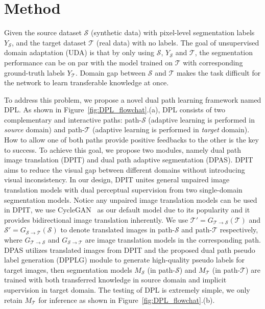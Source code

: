 \documentclass[10pt,twocolumn,letterpaper]{article}
\begin{document}
\section{Method}
Given the source dataset $\mathcal{S}$ (synthetic data) with pixel-level segmentation labels $Y_\mathcal{S}$, and the target dataset $\mathcal{T}$ (real data) with no labels. The goal of unsupervised domain adaptation (UDA) is that by only using $\mathcal{S}$, $Y_\mathcal{S}$ and $\mathcal{T}$, the segmentation performance can be on par with the model trained on $\mathcal{T}$ with corresponding ground-truth labels $Y_\mathcal{T}$. Domain gap between $\mathcal{S}$ and $\mathcal{T}$ makes the task difficult for the network to learn transferable knowledge at once.

To address this problem, we propose a novel dual path learning framework named DPL. As shown in Figure~\ref{fig:DPL_flowchat}.(a), DPL consists of two complementary and interactive paths: path-$\mathcal{S}$ (adaptive learning is performed in \emph{source} domain) and path-$\mathcal{T}$ (adaptive learning is performed in \emph{target} domain). How to allow one of both paths provide positive feedbacks to the other is the key to success. To achieve this goal, we propose two modules, namely dual path image translation (DPIT) and dual path adaptive segmentation (DPAS). DPIT aims to reduce the visual gap between different domains without introducing visual inconsistency. In our design, DPIT unites general unpaired image translation models with dual perceptual supervision from two single-domain segmentation models. Notice any unpaired image translation models can be used in DPIT, we use CycleGAN~\cite{CycleGAN2017} as our default model due to its popularity and it provides bidirectional image translation inherently. We use
$\mathcal{T}'=G_{\mathcal{T}\rightarrow\mathcal{S}}(\mathcal{T})$ and $\mathcal{S}'=G_{\mathcal{S}\rightarrow\mathcal{T}}(\mathcal{S})$ to denote translated images in path-$\mathcal{S}$ and path-$\mathcal{T}$ respectively, where $G_{\mathcal{T}\rightarrow\mathcal{S}}$ and $G_{\mathcal{S}\rightarrow\mathcal{T}}$ are image translation models in the corresponding path. DPAS utilizes translated images from DPIT and the proposed dual path pseudo label generation (DPPLG) module to generate high-quality pseudo labels for target images, then segmentation models $M_{\mathcal{S}}$ (in path-$\mathcal{S}$) and $M_{\mathcal{T}}$ (in path-$\mathcal{T}$) are trained with both transferred knowledge in source domain and implicit supervision in target domain. The testing of DPL is extremely simple, we only retain $M_{\mathcal{T}}$ for inference as shown in Figure~\ref{fig:DPL_flowchat}.(b).
\end{document}
